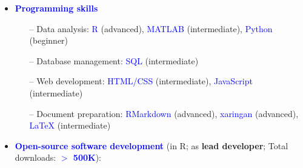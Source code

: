\documentclass[10pt]{article}
\begin{document}
	\begin{itemize}
	
	\item \textcolor{blue}{\textbf{Programming skills}}\\
     \vspace*{-0.09in}
     
    \begin{itemize}
    
    \itemsep-0.1em		
	\item[--] Data analysis: \textcolor{blue}{R} (advanced), \textcolor{blue}{MATLAB} (intermediate), \textcolor{blue}{Python} (beginner)
	\item[--] Database management: \textcolor{blue}{SQL} (intermediate)
	\item[--] Web development: \textcolor{blue}{HTML/CSS} (intermediate), \textcolor{blue}{JavaScript} (intermediate)
	\item[--] Document preparation: \textcolor{blue}{RMarkdown} (advanced), \textcolor{blue}{xaringan} (advanced), \textcolor{blue}{\LaTeX{}} (intermediate)

	\end{itemize}
	
	\item \textcolor{blue}{\textbf{Open-source software development}} (in R; as \textbf{lead developer}; Total downloads: \textcolor{blue}{\textbf{$>$ 500K}}):
	 \vspace*{-0.09in}
	 
	\begin{itemize}
	

\end{itemize}
\end{itemize}
\end{document}

